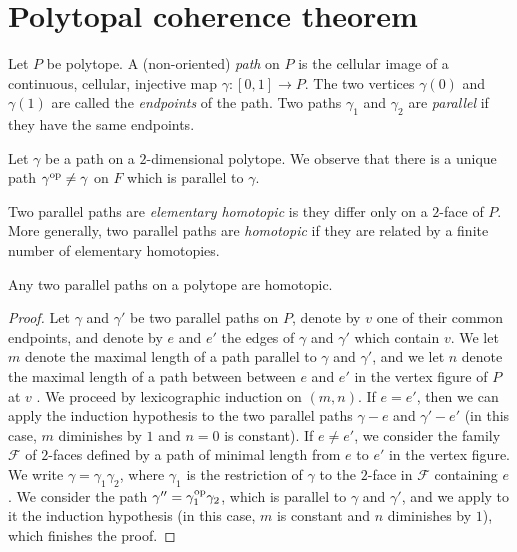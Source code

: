 
\section{Polytopal coherence theorem} 
\label{s:polycoherence}


Let $P$ be polytope.
A (non-oriented) \emph{path} on $P$ is the cellular image of a continuous, cellular, injective map $\gamma : [0,1] \to P$. 
The two vertices $\gamma(0)$ and $\gamma(1)$ are called the \emph{endpoints} of the path. 
Two paths $\gamma_1$ and $\gamma_2$ are \emph{parallel} if they have the same endpoints. 

Let $\gamma$ be a path on a $2$-dimensional polytope. 
We observe that there is a unique path $\gamma^{\mathrm{op}} \neq \gamma$ on $F$ which is parallel to $\gamma$. 

\begin{definition}
    Two parallel paths are \emph{elementary homotopic} is they differ only on a $2$-face of $P$. 
    More generally, two parallel paths are \emph{homotopic} if they are related by a finite number of elementary homotopies.
\end{definition}

\begin{thm}
    \label{t:polytopal-coherence}
    Any two parallel paths on a polytope are homotopic. 
\end{thm}

\begin{proof}
    Let $\gamma$ and $\gamma'$ be two parallel paths on $P$, denote by $v$ one of their common endpoints, and denote by $e$ and $e'$ the edges of $\gamma$ and $\gamma'$ which contain $v$. 
    We let $m$ denote the maximal length of a path parallel to $\gamma$ and $\gamma'$, and we let $n$ denote the maximal length of a path between between $e$ and $e'$ in the vertex figure of $P$ at $v$ \cite[Section 2.1]{Ziegler95}.
    We proceed by lexicographic induction on $(m,n)$. 
    If $e=e'$, then we can apply the induction hypothesis to the two parallel paths $\gamma - e$ and $\gamma' - e'$ (in this case, $m$ diminishes by $1$ and $n=0$ is constant). 
    If $e \neq e'$, we consider the family $\mathcal{F}$ of $2$-faces defined by a path of minimal length from $e$ to $e'$ in the vertex figure. 
    We write $\gamma = \gamma_1 \gamma_2$, where $\gamma_1$ is the restriction of $\gamma$ to the $2$-face in $\mathcal{F}$ containing $e$. 
    We consider the path $\gamma''=\gamma_1^{\mathrm{op}} \gamma_2$, which is parallel to $\gamma$ and $\gamma'$, and we apply to it the induction hypothesis (in this case, $m$ is constant and $n$ diminishes by $1$), which finishes the proof. 
\end{proof}

